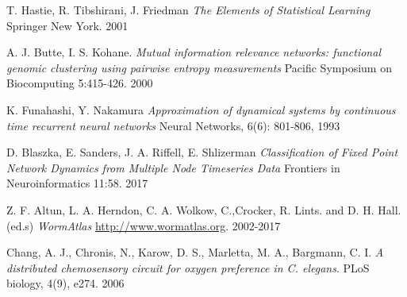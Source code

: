 \documentclass[letterpaper,11pt]{article}
\begin{document}
\begin{thebibliography}{9}
T. Hastie, R. Tibshirani, J. Friedman 
\textit{The Elements of Statistical Learning}
Springer New York. 2001

A. J. Butte, I. S. Kohane.
\textit{Mutual information relevance networks: functional genomic clustering using pairwise entropy measurements} 
Pacific Symposium on Biocomputing 5:415-426. 2000

K. Funahashi, Y. Nakamura
\textit{Approximation of dynamical systems by continuous time recurrent neural networks}
Neural Networks, 6(6): 801-806, 1993

D. Blaszka, E. Sanders, J. A. Riffell, E. Shlizerman
\textit{Classification of Fixed Point Network Dynamics from Multiple Node Timeseries Data}
Frontiers in Neuroinformatics 11:58. 2017

Z. F. Altun, L. A. Herndon, C. A. Wolkow, C.,Crocker, R. Lints. and D. H. Hall. (ed.s) \textit{WormAtlas}
\url{http://www.wormatlas.org}. 2002-2017

Chang, A. J., Chronis, N., Karow, D. S., Marletta, M. A., Bargmann, C. I. \textit{A distributed chemosensory circuit for oxygen preference in C. elegans}. PLoS biology, 4(9), e274. 2006



\end{thebibliography}
\end{document}
